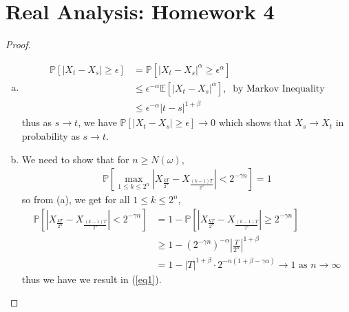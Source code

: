 \documentclass[a4paper,12pt]{article}
\theoremstyle{definition}
\begin{document}
\section*{Real Analysis: Homework 4}


\begin{proof}
\hspace{1em}
\begin{enumerate}[(a)]
\item  
\begin{align*}
\mathbb{P}[|X_t-X_s|\geq \epsilon] &= \mathbb{P}[|X_t-X_s|^\alpha\geq \epsilon^\alpha]\\
&\leq \epsilon^{-\alpha}\mathbb{E}[|X_t-X_s|^\alpha],~ \text{ by Markov Inequality}\\
& \leq  \epsilon^{-\alpha}|t-s|^{1+\beta}
\end{align*}
thus as $s \to t$, we have $\mathbb{P}[|X_t-X_s|\geq \epsilon] \to 0$ which shows that $X_s \to X_t$ in probability as $s \to t$.


\item We need to show that for $n \geq N(\omega)$,
\begin{align}
\mathbb{P}\left[\max_{1 \leq k \leq 2^n}\left|X_{\frac{kT}{2^n}}-X_{\frac{(k-1)T}{2^n}}\right|<2^{-\gamma n}\right]=1\label{eq1}
\end{align}
so from (a), we get for all $1 \leq k \leq 2^n$,
\begin{align*}
\mathbb{P}\left[\left|X_{\frac{kT}{2^n}}-X_{\frac{(k-1)T}{2^n}}\right|<2^{-\gamma n}\right] &= 1- \mathbb{P}\left[\left|X_{\frac{kT}{2^n}}-X_{\frac{(k-1)T}{2^n}}\right|\geq 2^{-\gamma n}\right]\\
& \geq 1 - (2^{-\gamma n})^{-\alpha}\left|\frac{T}{2^n}\right|^{1+\beta}\\
& = 1 - |T|^{1+\beta}\cdot 2^{-n(1+\beta-\gamma\alpha)} \to 1 \text{ as } n \to \infty 
\end{align*}
thus we have we result in (\ref{eq1}).


\end{enumerate}
\end{proof}
\end{document}
